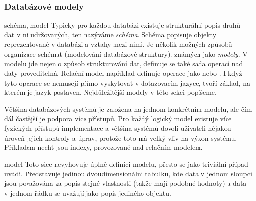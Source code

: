 \subsubsection*{Databázové modely}

\begin{definiceN}{schéma, model}
Typicky pro každou databázi existuje strukturální popis druhů dat v ní udržovaných, ten nazýváme \emph{schéma}. Schéma popisuje objekty reprezentované v databázi a vztahy mezi nimi. Je několik možných způsobů organizace schémat (modelování databázové struktury), známých jako \emph{modely}. V modelu jde nejen o způsob strukturování dat, definuje se také sada operací nad daty proveditelná. Relační model například definuje operace jako  nebo . I když tyto operace se nemusejí přímo vyskytovat v dotazovacím jazyce, tvoří základ, na kterém je jazyk postaven. Nejdůležitější modely v této sekci popíšeme.
\end{definiceN}

\begin{poznamka}
Většina databázových systémů je založena na jednom konkrétním modelu, ale čím dál častější je podpora více přístupů. Pro každý logický model existuje více fyzických přístupů implementace a většina systémů dovolí uživateli nějakou úroveň jejich kontroly a úprav, protože toto má velký vliv na výkon systému. Příkladem nechť jsou indexy, provozované nad relačním modelem.
\end{poznamka}

\begin{obecne}{ model}
Toto sice nevyhovuje úplně definici modelu, přesto se jako triviální případ uvádí. Představuje jedinou dvoudimensionální tabulku, kde data v jednom sloupci jsou považována za popis stejné vlastnosti (takže mají podobné hodnoty) a data v jednom řádku se uvažují jako popis jediného objektu.
\end{obecne}

